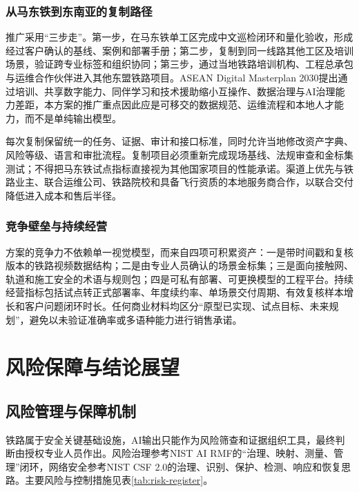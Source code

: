 \documentclass[UTF8,a4paper,zihao=-4]{ctexart}
\begin{document}
\subsubsection{从马东铁到东南亚的复制路径}

推广采用“三步走”。第一步，在马东铁单工区完成中文巡检闭环和量化验收，形成经过客户确认的基线、案例和部署手册；第二步，复制到同一线路其他工区及培训场景，验证跨专业标签和组织协同；第三步，通过当地铁路培训机构、工程总承包与运维合作伙伴进入其他东盟铁路项目。ASEAN Digital Masterplan 2030提出通过培训、共享数字能力、同伴学习和技术援助缩小互操作、数据治理与AI治理能力差距\cite{asean-digital-2030}，本方案的推广重点因此应是可移交的数据规范、运维流程和本地人才能力，而不是单纯输出模型。

每次复制保留统一的任务、证据、审计和接口标准，同时允许当地修改资产字典、风险等级、语言和审批流程。复制项目必须重新完成现场基线、法规审查和金标集测试；不得把马东铁试点指标直接视为其他国家项目的性能承诺。渠道上优先与铁路业主、联合运维公司、铁路院校和具备飞行资质的本地服务商合作，以联合交付降低进入成本和售后半径。

\subsubsection{竞争壁垒与持续经营}

方案的竞争力不依赖单一视觉模型，而来自四项可积累资产：一是带时间戳和复核版本的铁路视频数据结构；二是由专业人员确认的场景金标集；三是面向接触网、轨道和施工安全的术语与规则包；四是可私有部署、可更换模型的工程平台。持续经营指标包括试点转正式部署率、年度续约率、单场景交付周期、有效复核样本增长和客户问题闭环时长。任何商业材料均区分“原型已实现、试点目标、未来规划”，避免以未验证准确率或多语种能力进行销售承诺。

\section{风险保障与结论展望}

\subsection{风险管理与保障机制}

铁路属于安全关键基础设施，AI输出只能作为风险筛查和证据组织工具，最终判断由授权专业人员作出。风险治理参考NIST AI RMF的“治理、映射、测量、管理”闭环\cite{nist-ai-rmf}，网络安全参考NIST CSF 2.0的治理、识别、保护、检测、响应和恢复思路\cite{nist-csf}。主要风险与控制措施见表\ref{tab:risk-register}。
\end{document}
